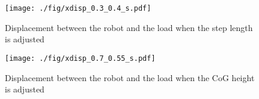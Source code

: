 \begin{figure}[t]
    \begin{center}
    \texttt{[image: ./fig/xdisp\_0.3\_0.4\_s.pdf]}
    \caption{Displacement between the robot and the load when the step length is adjusted}
\end{center}
\end{figure}
\begin{figure}[tb]
    \begin{center}
    \texttt{[image: ./fig/xdisp\_0.7\_0.55\_s.pdf]}
    \caption{Displacement between the robot and the load when the CoG height is adjusted}
\end{center}
\end{figure}


